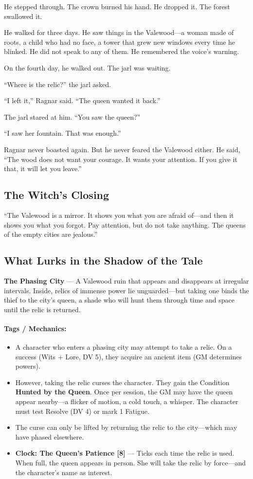 \documentclass[9pt,a5paper]{extbook}
\begin{document}
He stepped through. The crown burned his hand. He dropped it. The forest swallowed it.

He walked for three days. He saw things in the Valewood---a woman made of roots, a child who had no face, a tower that grew new windows every time he blinked. He did not speak to any of them. He remembered the voice's warning.

On the fourth day, he walked out. The jarl was waiting.

``Where is the relic?'' the jarl asked.

``I left it,'' Ragnar said. ``The queen wanted it back.''

The jarl stared at him. ``You saw the queen?''

``I saw her fountain. That was enough.''

Ragnar never boasted again. But he never feared the Valewood either. He said, ``The wood does not want your courage. It wants your attention. If you give it that, it will let you leave.''

\subsection*{The Witch's Closing}

``The Valewood is a mirror. It shows you what you are afraid of---and then it shows you what you forgot. Pay attention, but do not take anything. The queens of the empty cities are jealous.''

\subsection*{What Lurks in the Shadow of the Tale}

\textbf{The Phasing City} --- A Valewood ruin that appears and disappears at irregular intervals. Inside, relics of immense power lie unguarded---but taking one binds the thief to the city's queen, a shade who will hunt them through time and space until the relic is returned.

\paragraph{Tags / Mechanics:}
\begin{itemize}
    \item A character who enters a phasing city may attempt to take a relic. On a success (Wits + Lore, DV 5), they acquire an ancient item (GM determines powers).
    \item However, taking the relic curses the character. They gain the Condition \textbf{Hunted by the Queen}. Once per session, the GM may have the queen appear nearby---a flicker of motion, a cold touch, a whisper. The character must test Resolve (DV 4) or mark 1 Fatigue.
    \item The curse can only be lifted by returning the relic to the city---which may have phased elsewhere.
    \item \textbf{Clock: The Queen's Patience [8]} --- Ticks each time the relic is used. When full, the queen appears in person. She will take the relic by force---and the character's name as interest.
\end{itemize}
\end{document}

